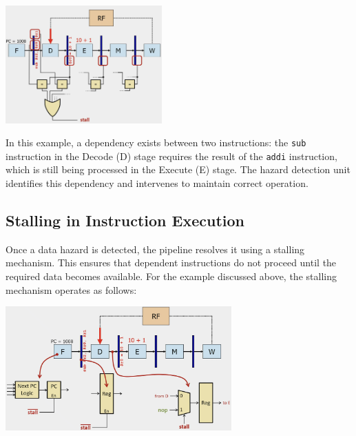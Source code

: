 \begin{center}
    \includegraphics[width=0.45\textwidth]{chapters/chapter4c/images/detect.png}
\end{center}

In this example, a dependency exists between two instructions: the \texttt{sub} instruction in the Decode (D) stage requires the result of the \texttt{addi} instruction, which is still being processed in the Execute (E) stage. The hazard detection unit identifies this dependency and intervenes to maintain correct operation.

\subsection{Stalling in Instruction Execution}
Once a data hazard is detected, the pipeline resolves it using a stalling mechanism. This ensures that dependent instructions do not proceed until the required data becomes available. For the example discussed above, the stalling mechanism operates as follows:
\begin{center}
    \includegraphics[width=0.65\textwidth]{chapters/chapter4c/images/stalling.png}
\end{center}
